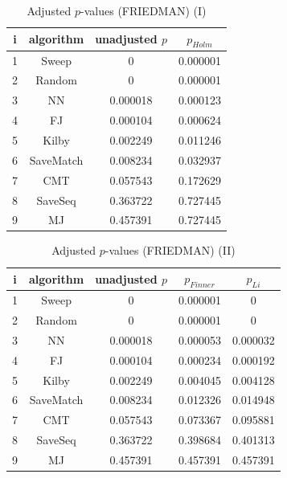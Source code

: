 \documentclass[a4paper,10pt]{article}
\begin{document}
\begin{landscape}
\begin{table}[!htp]
\centering\small
\begin{tabular}{cccc}
i&algorithm&unadjusted $p$&$p_{Holm}$\\
\hline1&Sweep&0&0.000001\\2&Random&0&0.000001\\3&NN&0.000018&0.000123\\4&FJ&0.000104&0.000624\\5&Kilby&0.002249&0.011246\\6&SaveMatch&0.008234&0.032937\\7&CMT&0.057543&0.172629\\8&SaveSeq&0.363722&0.727445\\9&MJ&0.457391&0.727445\\\hline
\end{tabular}
\caption{Adjusted $p$-values (FRIEDMAN) (I)}
\end{table}
\begin{table}[!htp]
\centering\small
\begin{tabular}{ccccc}
i&algorithm&unadjusted $p$&$p_{Finner}$&$p_{Li}$\\
\hline1&Sweep&0&0.000001&0\\2&Random&0&0.000001&0\\3&NN&0.000018&0.000053&0.000032\\4&FJ&0.000104&0.000234&0.000192\\5&Kilby&0.002249&0.004045&0.004128\\6&SaveMatch&0.008234&0.012326&0.014948\\7&CMT&0.057543&0.073367&0.095881\\8&SaveSeq&0.363722&0.398684&0.401313\\9&MJ&0.457391&0.457391&0.457391\\\hline
\end{tabular}
\caption{Adjusted $p$-values (FRIEDMAN) (II)}
\end{table}

\newpage
\end{landscape}
\end{document}
